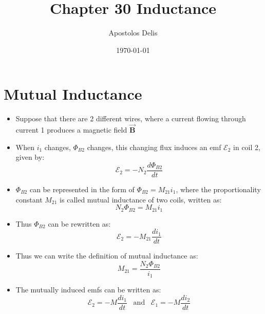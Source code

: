 \documentclass[11pt, a4paper]{article}
\begin{document}
\title{Chapter 30 Inductance}
\author{Apostolos Delis}

\date{\today}
\maketitle

\tableofcontents
\section[30.1, Mutual Inductance]{Mutual Inductance}
\begin{itemize}
    \item Suppose that there are 2 different wires, where a current flowing through
        current 1 produces a magnetic field $\vec{\mathbf{B}}$
    \item When $i_1$ changes, $\Phi_{B2}$ changes, this changing flux induces an emf
        $\mathcal{E}_2$ in coil 2, given by:
        \begin{equation}
            \mathcal{E}_2 = -N_2 \frac{d\Phi_{B2}}{dt}
        \end{equation}
    \item $\Phi_{B2}$ can be represented in the form of $\Phi_{B2} = M_{21}i_1$, where
        the proportionality constant $M_{21}$ is called mutual inductance of two coils,
        written as:
        \begin{equation}
            N_2\Phi_{B2} = M_{21}i_1
        \end{equation}
    \item Thus $\Phi_{B2}$ can be rewritten as:
        \begin{equation}
            \mathcal{E}_2 = -M_{21}\frac{di_1}{dt}
        \end{equation}
    \item Thus we can write the definition of mutual inductance as:
        \begin{equation}
            M_{21} = \frac{N_2\Phi_{B2}}{i_1}
        \end{equation}
    \item The mutually induced emfs can be written as:
        \begin{equation}
            \mathcal{E}_2 = -M\frac{di_1}{dt} \; \; \; \text{and} \; \; \; 
            \mathcal{E}_1 = -M\frac{di_2}{dt}
        \end{equation}
\end{itemize}
\end{document}
